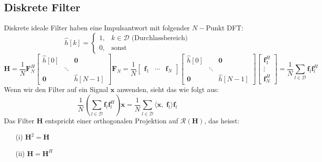 \documentclass[11pt]{article}
\begin{document}
\subsection*{Diskrete Filter}
\vspace*{-0.5cm}
Diskrete ideale Filter haben eine Impulsantwort mit folgender $N-$Punkt DFT:
$$\hat{h}[k] = \begin{cases}
    1, \hspace{10pt} k \in \mathcal{D} \text{ (Durchlassbereich)} \\
    0, \hspace{10pt} \text{sonst}
\end{cases}$$
$$\mathbf{H} = \frac{1}{N} \mathbf{F}_N^H \begin{bmatrix}
    \hat{h}[0] & & \mathbf{0} \\
    & \ddots & \\
    \mathbf{0} & & \hat{h}[N-1]
\end{bmatrix} \mathbf{F}_N = \frac{1}{N} \begin{bmatrix}
    \mathbf{f}_1 & \cdots & \mathbf{f}_N
\end{bmatrix} \begin{bmatrix}
    \hat{h}[0] & & \mathbf{0} \\
    & \ddots & \\
    \mathbf{0} & & \hat{h}[N-1]
\end{bmatrix} \begin{bmatrix}
    \mathbf{f}_1^H \\
    \vdots \\
    \mathbf{f}_N^H
\end{bmatrix} = \frac{1}{N} \sum_{l \in \mathcal{D}} \mathbf{f}_l \mathbf{f}_l^H $$
\vspace*{-0.25cm}
Wenn wir den Filter auf ein Signal $\mathbf{x}$ anwenden, sieht das wie folgt aus:
$$\frac{1}{N} \left( \sum_{l \in \mathcal{D}} \mathbf{f}_l \mathbf{f}_l^H \right) \mathbf{x} = \frac{1}{N} \sum_{l \in \mathcal{D}} \langle \mathbf{x}, \; \mathbf{f}_l \rangle \mathbf{f}_l$$
Das Filter $\mathbf{H}$ entspricht einer orthogonalen Projektion auf $\mathcal{R}(\mathbf{H})$, das heisst:
\vspace*{-0.4cm}
\begin{multicols}{2}
    \begin{itemize}
        \item[(i)] $\mathbf{H}^2 = \mathbf{H}$
        \item[(ii)] $\mathbf{H} = \mathbf{H}^H$
    \end{itemize}
\end{multicols}
\end{document}
